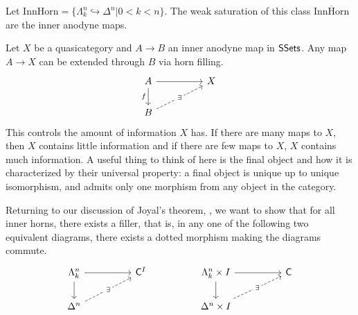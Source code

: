 \begin{example}\label{ex: weak sat of inner horns are inner anodyne}
  Let $\mathrm{InnHorn}=\{\Lambda^{n}_{k}\hookrightarrow\Delta^{n}|0<k<n\}$. The weak saturation of this class $\overline{\mathrm{InnHorn}}$ are the inner anodyne maps. 
\end{example}
\begin{remark}
  Let $X$ be a quasicategory and $A\to B$ an inner anodyne map in $\mathsf{SSets}$. Any map $A\to X$ can be extended through $B$ via horn filling. 
  $$%
  \begin{tikzcd}
    A && X \\
    B
    \arrow["\exists"{description}, dashed, from=2-1, to=1-3]
    \arrow["f"', from=1-1, to=2-1]
    \arrow[from=1-1, to=1-3]
  \end{tikzcd}$$
  This controls the amount of information $X$ has. If there are many maps to $X$, then $X$ contains little information and if there are few maps to $X$, $X$ contains much information. A useful thing to think of here is the final object and how it is characterized by their universal property: a final object is unique up to unique isomorphism, and admits only one morphism from any object in the category. 
\end{remark}
Returning to our discussion of Joyal's theorem, , we want to show that for all inner horns, there exists a filler, that is, in any one of the following two equivalent diagrams, there exists a dotted morphism making the diagrams commute. 
$$%
\begin{tikzcd}
	{\Lambda^{n}_{k}} && {\Csf^{I}} && {\Lambda^{n}_{k}\times I} && \Csf \\
	{\Delta^{n}} &&&& {\Delta^{n}\times I}
	\arrow[from=1-1, to=1-3]
	\arrow[from=1-1, to=2-1]
	\arrow[from=1-5, to=2-5]
	\arrow[from=1-5, to=1-7]
	\arrow["\exists"{description}, dashed, from=2-5, to=1-7]
	\arrow["\exists"{description}, dashed, from=2-1, to=1-3]
\end{tikzcd}$$
